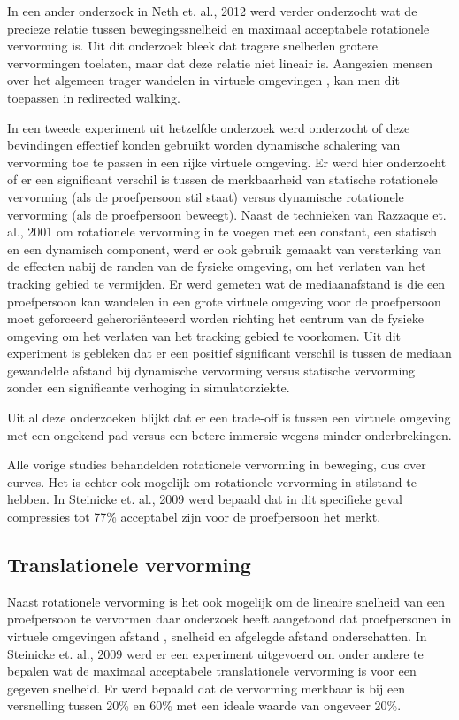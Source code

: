 In een ander onderzoek in Neth et. al., 2012 \cite{neth12} werd verder 
onderzocht wat de precieze relatie tussen bewegingssnelheid en maximaal 
acceptabele rotationele vervorming is. Uit dit onderzoek bleek dat tragere 
snelheden grotere vervormingen toelaten, maar dat deze relatie niet lineair is.
Aangezien mensen over het algemeen trager wandelen in virtuele omgevingen
\cite{mohler07}, kan men dit toepassen in redirected walking.

In een tweede experiment uit hetzelfde onderzoek \cite{neth12} werd onderzocht 
of deze bevindingen effectief konden gebruikt worden dynamische schalering van 
vervorming toe te passen in een rijke virtuele omgeving. Er werd hier onderzocht 
of er een significant verschil is tussen de merkbaarheid van statische 
rotationele vervorming (als de proefpersoon stil staat) versus dynamische 
rotationele vervorming (als de proefpersoon beweegt). Naast de technieken van 
Razzaque et. al., 2001 \cite{kohn01} om rotationele vervorming in te voegen met 
een constant, een statisch en een dynamisch component, werd er ook gebruik 
gemaakt van versterking van de effecten nabij de randen van de fysieke omgeving, 
om het verlaten van het tracking gebied te vermijden. Er werd gemeten wat de 
mediaanafstand is die een proefpersoon kan wandelen in een grote virtuele 
omgeving voor de proefpersoon moet geforceerd geherori\"enteeerd worden richting
het centrum van de fysieke omgeving om het verlaten van het tracking gebied te 
voorkomen. Uit dit experiment is gebleken dat er een positief significant 
verschil is tussen de mediaan gewandelde afstand bij dynamische vervorming 
versus statische vervorming zonder een significante verhoging in simulatorziekte.

Uit al deze onderzoeken blijkt dat er een trade-off is tussen een virtuele 
omgeving met een ongekend pad\cite{neth12} versus een betere immersie wegens 
minder onderbrekingen\cite{engel08,kohn01}. 

Alle vorige studies behandelden rotationele vervorming in beweging, dus over 
curves. Het is echter ook mogelijk om rotationele vervorming in stilstand te
hebben. In Steinicke et. al., 2009 \cite{steinicke09} werd bepaald dat in dit 
specifieke geval compressies tot 77\% acceptabel zijn voor de proefpersoon het 
merkt.


\subsection{Translationele vervorming}
Naast rotationele vervorming is het ook mogelijk om de lineaire snelheid van een
proefpersoon te vervormen daar onderzoek heeft aangetoond dat proefpersonen in 
virtuele omgevingen afstand \cite{loomis03}, snelheid \cite{banton05} en 
afgelegde afstand \cite{frenz07} onderschatten. In Steinicke et. al., 2009 \cite{steinicke09} 
werd er een experiment uitgevoerd om onder andere te bepalen wat de maximaal 
acceptabele translationele vervorming is voor een gegeven snelheid. Er werd 
bepaald dat de vervorming merkbaar is bij een versnelling tussen 20\% en 60\% 
met een ideale waarde van ongeveer 20\%.

